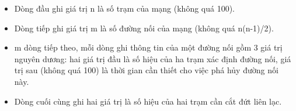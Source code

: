 \begin{itemize}
	\item     Dòng đầu ghi giá trị n là số trạm của mạng (không quá 100).   
	\item     Dòng tiếp ghi giá trị m là số đường nối của mạng (không quá n(n-1)/2).   
	\item     m dòng tiếp theo, mỗi dòng ghi thông tin của một đường nối gồm 3 giá trị nguyên dương: hai giá trị đầu là số hiệu của ha trạm xác định đường nối,   giá trị sau (không quá 100) là thời gian cần thiết cho việc phá hủy đường nối này.   
	\item     Dòng cuối cùng ghi hai giá trị là số hiệu của hai trạm cần cắt đứt liên lạc.   
\end{itemize}